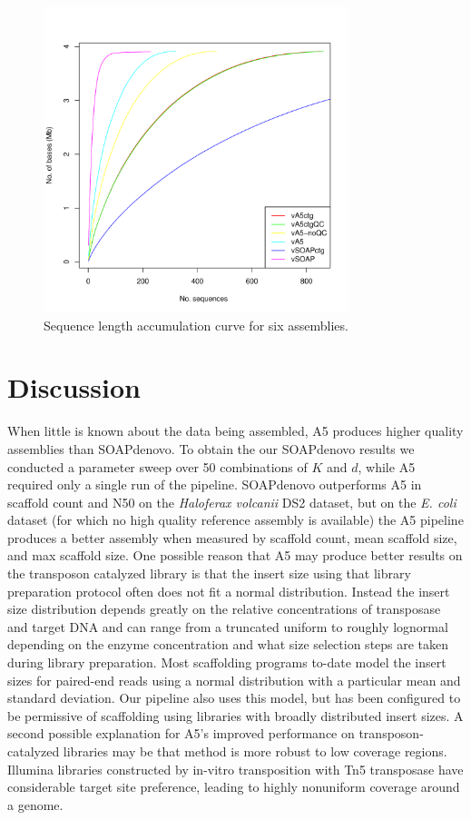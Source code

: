\documentclass{bioinfo}
\begin{document}
\begin{figure}[t]
\includegraphics[width=3.5in]{volc_accum_plot.pdf}
\vspace{-1cm}
\caption{Sequence length accumulation curve for six assemblies.}\label{fig:03}
\end{figure}

\section{Discussion}

When little is known about the data being assembled, A5 produces higher quality assemblies 
than SOAPdenovo. To obtain the our SOAPdenovo results we conducted a parameter sweep 
over 50 combinations of $K$ and $d$, while A5 required
only a single run of the pipeline.
SOAPdenovo outperforms A5 in scaffold count and N50 on the \textit{Haloferax volcanii} DS2 dataset, but on the \textit{E. coli} dataset 
(for which no high quality reference assembly is available) the
A5 pipeline produces a better assembly when measured by scaffold count, mean scaffold size, and max scaffold size.
One possible reason that A5 may produce better results on the transposon catalyzed library is that the insert size using
that library preparation protocol often does not fit a normal distribution.  Instead the insert size 
distribution depends greatly on the relative concentrations of transposase and target DNA and can range from a truncated uniform
to roughly lognormal depending on the enzyme concentration and what size selection steps are taken during library preparation.
Most scaffolding programs to-date model the insert sizes for paired-end reads using a normal distribution with a particular
mean and standard deviation. Our pipeline also uses this model, but has been configured to be permissive of scaffolding
using libraries with broadly distributed insert sizes.  A second possible explanation for A5's improved performance on transposon-catalyzed 
libraries may be that method is more robust to low coverage regions.  Illumina libraries constructed by in-vitro 
transposition with Tn5 transposase have considerable target site preference, leading to highly nonuniform coverage around a genome.
\end{document}
